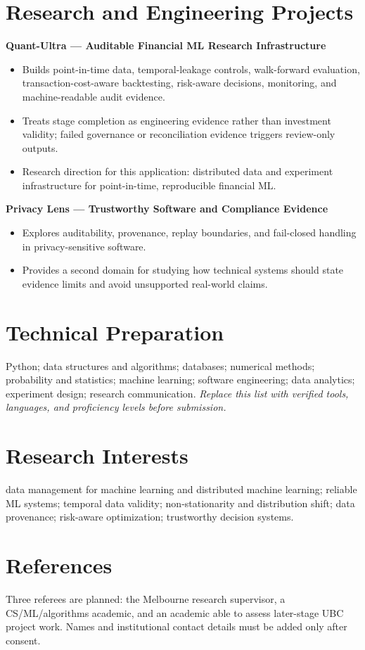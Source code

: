 \documentclass[11pt]{article}
\begin{document}
\section*{Research and Engineering Projects}
\textbf{Quant-Ultra --- Auditable Financial ML Research Infrastructure}
\begin{itemize}
\item Builds point-in-time data, temporal-leakage controls, walk-forward evaluation, transaction-cost-aware backtesting, risk-aware decisions, monitoring, and machine-readable audit evidence.
\item Treats stage completion as engineering evidence rather than investment validity; failed governance or reconciliation evidence triggers review-only outputs.
\item Research direction for this application: distributed data and experiment infrastructure for point-in-time, reproducible financial ML.
\end{itemize}

\textbf{Privacy Lens --- Trustworthy Software and Compliance Evidence}
\begin{itemize}
\item Explores auditability, provenance, replay boundaries, and fail-closed handling in privacy-sensitive software.
\item Provides a second domain for studying how technical systems should state evidence limits and avoid unsupported real-world claims.
\end{itemize}

\section*{Technical Preparation}
Python; data structures and algorithms; databases; numerical methods; probability and statistics; machine learning; software engineering; data analytics; experiment design; research communication. \textit{Replace this list with verified tools, languages, and proficiency levels before submission.}

\section*{Research Interests}
data management for machine learning and distributed machine learning; reliable ML systems; temporal data validity; non-stationarity and distribution shift; data provenance; risk-aware optimization; trustworthy decision systems.

\section*{References}
Three referees are planned: the Melbourne research supervisor, a CS/ML/algorithms academic, and an academic able to assess later-stage UBC project work. Names and institutional contact details must be added only after consent.
\end{document}

